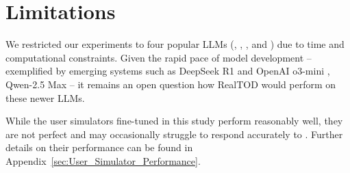 \section{Limitations}



We restricted our experiments to four popular LLMs (\GPTLongName, \ClaudeLongName, \DeepSeekLongName, and \LlamaLongName) due to time and computational constraints. Given the rapid pace of model development -- exemplified by emerging systems such as DeepSeek R1 \cite{guo2025deepseek} and OpenAI o3-mini \cite{o3}, Qwen-2.5 Max \cite{qwen2024max} -- it remains an open question how RealTOD would perform on these newer LLMs.

While the user simulators fine-tuned in this study perform reasonably well, they are not perfect and may occasionally struggle to respond accurately to {\ours}.  Further details on their performance can be found in Appendix~\ref{sec:User_Simulator_Performance}. %



